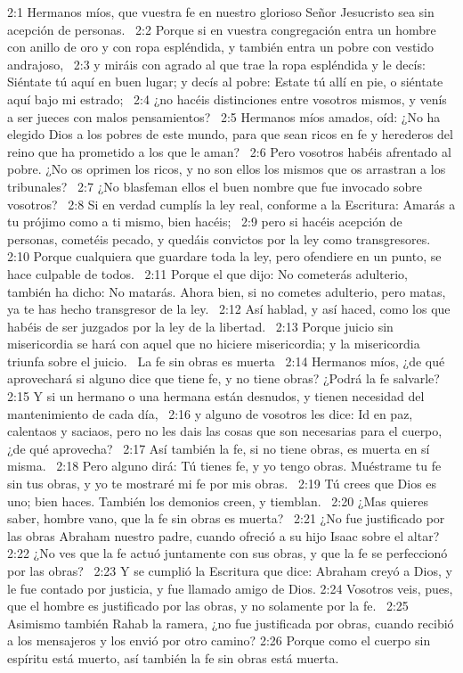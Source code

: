 2:1 Hermanos míos, que vuestra fe en nuestro glorioso Señor Jesucristo sea sin acepción de personas.  
2:2 Porque si en vuestra congregación entra un hombre con anillo de oro y con ropa espléndida, y también entra un pobre con vestido andrajoso,  
2:3 y miráis con agrado al que trae la ropa espléndida y le decís: Siéntate tú aquí en buen lugar; y decís al pobre: Estate tú allí en pie, o siéntate aquí bajo mi estrado;  
2:4 ¿no hacéis distinciones entre vosotros mismos, y venís a ser jueces con malos pensamientos?  
2:5 Hermanos míos amados, oíd: ¿No ha elegido Dios a los pobres de este mundo, para que sean ricos en fe y herederos del reino que ha prometido a los que le aman?  
2:6 Pero vosotros habéis afrentado al pobre. ¿No os oprimen los ricos, y no son ellos los mismos que os arrastran a los tribunales?  
2:7 ¿No blasfeman ellos el buen nombre que fue invocado sobre vosotros?  
2:8 Si en verdad cumplís la ley real, conforme a la Escritura: Amarás a tu prójimo como a ti mismo, bien hacéis;  
2:9 pero si hacéis acepción de personas, cometéis pecado, y quedáis convictos por la ley como transgresores.  
2:10 Porque cualquiera que guardare toda la ley, pero ofendiere en un punto, se hace culpable de todos.  
2:11 Porque el que dijo: No cometerás adulterio, también ha dicho: No matarás. Ahora bien, si no cometes adulterio, pero matas, ya te has hecho transgresor de la ley.  
2:12 Así hablad, y así haced, como los que habéis de ser juzgados por la ley de la libertad.  
2:13 Porque juicio sin misericordia se hará con aquel que no hiciere misericordia; y la misericordia triunfa sobre el juicio.  
La fe sin obras es muerta  
2:14 Hermanos míos, ¿de qué aprovechará si alguno dice que tiene fe, y no tiene obras? ¿Podrá la fe salvarle?  
2:15 Y si un hermano o una hermana están desnudos, y tienen necesidad del mantenimiento de cada día,  
2:16 y alguno de vosotros les dice: Id en paz, calentaos y saciaos, pero no les dais las cosas que son necesarias para el cuerpo, ¿de qué aprovecha?  
2:17 Así también la fe, si no tiene obras, es muerta en sí misma.  
2:18 Pero alguno dirá: Tú tienes fe, y yo tengo obras. Muéstrame tu fe sin tus obras, y yo te mostraré mi fe por mis obras.  
2:19 Tú crees que Dios es uno; bien haces. También los demonios creen, y tiemblan.  
2:20 ¿Mas quieres saber, hombre vano, que la fe sin obras es muerta?  
2:21 ¿No fue justificado por las obras Abraham nuestro padre, cuando ofreció a su hijo Isaac sobre el altar? 
2:22 ¿No ves que la fe actuó juntamente con sus obras, y que la fe se perfeccionó por las obras?  
2:23 Y se cumplió la Escritura que dice: Abraham creyó a Dios, y le fue contado por justicia, y fue llamado amigo de Dios. 
2:24 Vosotros veis, pues, que el hombre es justificado por las obras, y no solamente por la fe.  
2:25 Asimismo también Rahab la ramera, ¿no fue justificada por obras, cuando recibió a los mensajeros y los envió por otro camino? 
2:26 Porque como el cuerpo sin espíritu está muerto, así también la fe sin obras está muerta.  
